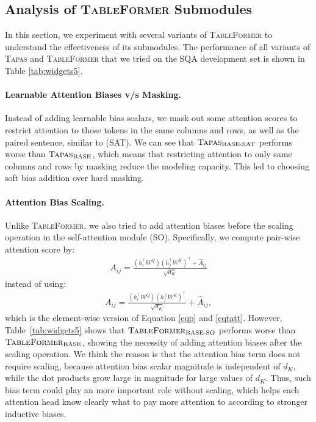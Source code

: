\documentclass[11pt]{article}
\begin{document}
\subsection{Analysis of \textsc{TableFormer} Submodules}
In this section, we experiment with several variants of \textsc{TableFormer} to understand the effectiveness of its submodules. The performance of all variants of \textsc{Tapas} and \textsc{TableFormer} that we tried on the SQA development set is shown in Table \ref{tab:widgets5}.

\paragraph{Learnable Attention Biases v/s Masking.} Instead of adding learnable bias scalars, we mask out some attention scores to restrict attention to those tokens in the same columns and rows, as well as the paired sentence, similar to \citet{zhang2020table} (SAT).  We can see that $\textsc{Tapas}_{\text{BASE-SAT}}$ performs worse than $\textsc{Tapas}_{\text{BASE}}$, which means that restricting attention to only same columns and rows by masking reduce the modeling capacity. This led to choosing soft bias addition over hard masking.

\paragraph{Attention Bias Scaling.} Unlike \textsc{TableFormer}, we also tried to add attention biases before the scaling operation in the self-attention module (SO). Specifically, we compute pair-wise attention score by:
\begin{equation}
\begin{aligned}
A_{ij} = \frac{(h_i^\top W^Q) (h_j^\top W^K)^\top + \hat{A}_{ij}}{\sqrt{d_K}}
\end{aligned}
\end{equation}
instead of using:
\begin{equation}
\begin{aligned}
A_{ij} = \frac{(h_i^\top W^Q) (h_j^\top W^K)^\top }{\sqrt{d_K}} + \hat{A}_{ij},
\end{aligned}
\end{equation}
which is the element-wise version of Equation \ref{eqp} and \ref{eqtatt}. However, Table~\ref{tab:widgets5} shows that  $\textsc{TableFormer}_{\text{BASE-SO}}$ performs worse than $\textsc{TableFormer}_{\text{BASE}}$, showing the necessity of adding attention biases after the scaling operation. 
We think the reason is that the attention bias term does not require scaling, because attention bias scalar magnitude is independent of $d_K$, while the dot products grow large in magnitude for large values of $d_K$. Thus, such bias term could play an more important role without scaling, which helps each attention head know clearly what to pay more attention to according to stronger inductive biases.
\end{document}
